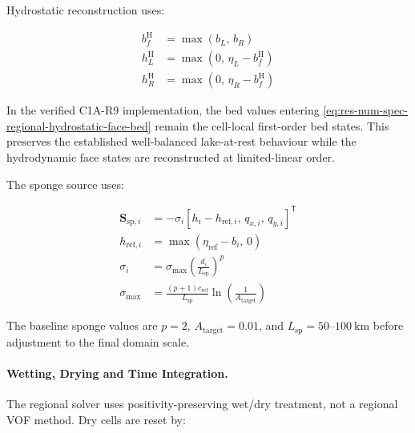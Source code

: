 Hydrostatic reconstruction uses:

\begin{align}
  b_f^{\mathrm{H}}
  &=
  \max
  \left(
    b_L,\,
    b_R
  \right)
  \label{eq:res-num-spec-regional-hydrostatic-face-bed}
  \\
  h_L^{\mathrm{H}}
  &=
  \max
  \left(
    0,\,
    \eta_L-b_f^{\mathrm{H}}
  \right)
  \label{eq:res-num-spec-regional-hydrostatic-left-depth}
  \\
  h_R^{\mathrm{H}}
  &=
  \max
  \left(
    0,\,
    \eta_R-b_f^{\mathrm{H}}
  \right)
  \label{eq:res-num-spec-regional-hydrostatic-right-depth}
\end{align}

In the verified C1A-R9 implementation, the bed values entering
\cref{eq:res-num-spec-regional-hydrostatic-face-bed} remain the
cell-local first-order bed states. This preserves the established
well-balanced lake-at-rest behaviour while the hydrodynamic face states
are reconstructed at limited-linear order.

The sponge source uses:

\begin{align}
  \mathbf{S}_{\mathrm{sp},i}
  &=
  -\sigma_i
  \left[
    h_i-h_{\mathrm{ref},i},\,
    q_{x,i},\,
    q_{y,i}
  \right]^{\mathsf{T}}
  \label{eq:res-num-spec-regional-sponge-source}
  \\
  h_{\mathrm{ref},i}
  &=
  \max
  \left(
    \eta_{\mathrm{ref}}
    -
    b_i,\,
    0
  \right)
  \label{eq:res-num-spec-regional-sponge-reference-depth}
  \\
  \sigma_i
  &=
  \sigma_{\max}
  \left(
    \frac{d_i}{L_{\mathrm{sp}}}
  \right)^p
  \label{eq:res-num-spec-regional-sponge-ramp}
  \\
  \sigma_{\max}
  &=
  \frac{(p+1)c_{\mathrm{ref}}}{L_{\mathrm{sp}}}
  \ln
  \left(
    \frac{1}{A_{\mathrm{target}}}
  \right)
  \label{eq:res-num-spec-regional-sponge-max}
\end{align}

The baseline sponge values are $p=2$, $A_{\mathrm{target}}=0.01$, and
$L_{\mathrm{sp}}=50$--$100~\mathrm{km}$ before adjustment to the final
domain scale.

\paragraph{Wetting, Drying and Time Integration.}
\label{sec:res-num-spec-regional-wet-dry-time}

The regional solver uses positivity-preserving wet/dry treatment, not a
regional VOF method. Dry cells are reset by:

